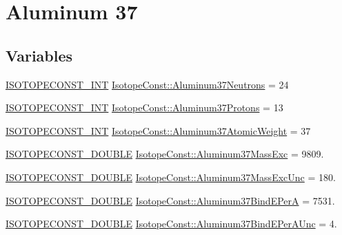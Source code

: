 \hypertarget{group___isotope_const-_aluminum-_al37}{}\section{Aluminum 37}
\label{group___isotope_const-_aluminum-_al37}
\subsection*{Variables}
\begin{DoxyCompactItemize}
\item 
\mbox{\hyperlink{group___isotope_const-_macros_ga5f18360b3e99483a35c32d789e62621c}{I\+S\+O\+T\+O\+P\+E\+C\+O\+N\+S\+T\+\_\+\+I\+NT}} \mbox{\hyperlink{group___isotope_const-_aluminum-_al37_gab076502cb64ddf556aa4d756edd0e709}{Isotope\+Const\+::\+Aluminum37\+Neutrons}} = 24
\item 
\mbox{\hyperlink{group___isotope_const-_macros_ga5f18360b3e99483a35c32d789e62621c}{I\+S\+O\+T\+O\+P\+E\+C\+O\+N\+S\+T\+\_\+\+I\+NT}} \mbox{\hyperlink{group___isotope_const-_aluminum-_al37_gac152948bcdcde1c58f68c814e4ec6142}{Isotope\+Const\+::\+Aluminum37\+Protons}} = 13
\item 
\mbox{\hyperlink{group___isotope_const-_macros_ga5f18360b3e99483a35c32d789e62621c}{I\+S\+O\+T\+O\+P\+E\+C\+O\+N\+S\+T\+\_\+\+I\+NT}} \mbox{\hyperlink{group___isotope_const-_aluminum-_al37_ga00549e4ccbc563b0f2835fcea6516cdd}{Isotope\+Const\+::\+Aluminum37\+Atomic\+Weight}} = 37
\item 
\mbox{\hyperlink{group___isotope_const-_macros_ga8f45a7272ce02c0b4c65c44636ed719a}{I\+S\+O\+T\+O\+P\+E\+C\+O\+N\+S\+T\+\_\+\+D\+O\+U\+B\+LE}} \mbox{\hyperlink{group___isotope_const-_aluminum-_al37_gaf48fd145d4b0966a5646215727ad4354}{Isotope\+Const\+::\+Aluminum37\+Mass\+Exc}} = 9809.
\item 
\mbox{\hyperlink{group___isotope_const-_macros_ga8f45a7272ce02c0b4c65c44636ed719a}{I\+S\+O\+T\+O\+P\+E\+C\+O\+N\+S\+T\+\_\+\+D\+O\+U\+B\+LE}} \mbox{\hyperlink{group___isotope_const-_aluminum-_al37_ga596e9423a6bfb0b15d1b572e3cb8e5ed}{Isotope\+Const\+::\+Aluminum37\+Mass\+Exc\+Unc}} = 180.
\item 
\mbox{\hyperlink{group___isotope_const-_macros_ga8f45a7272ce02c0b4c65c44636ed719a}{I\+S\+O\+T\+O\+P\+E\+C\+O\+N\+S\+T\+\_\+\+D\+O\+U\+B\+LE}} \mbox{\hyperlink{group___isotope_const-_aluminum-_al37_gafc703229af9ccc9cf92138a8c3bbd84b}{Isotope\+Const\+::\+Aluminum37\+Bind\+E\+PerA}} = 7531.
\item 
\mbox{\hyperlink{group___isotope_const-_macros_ga8f45a7272ce02c0b4c65c44636ed719a}{I\+S\+O\+T\+O\+P\+E\+C\+O\+N\+S\+T\+\_\+\+D\+O\+U\+B\+LE}} \mbox{\hyperlink{group___isotope_const-_aluminum-_al37_ga3a03002664c53cfe1d7393efcb569d3c}{Isotope\+Const\+::\+Aluminum37\+Bind\+E\+Per\+A\+Unc}} = 4.

\end{DoxyCompactItemize}
